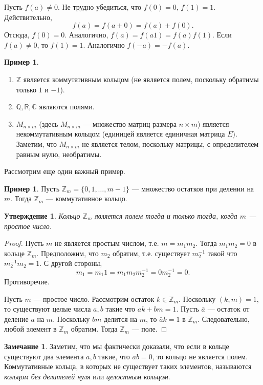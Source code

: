 \documentclass[12pt, titlepage, oneside]{amsbook}
\newcommand{\ZZ}{\mathbb{Z}}
\newcommand{\RR}{\mathbb{R}}
\newcommand{\CC}{\mathbb{C}}
\newcommand{\QQ}{\mathbb{Q}}
\newtheorem{claim}[theorem]{Утверждение}
\theoremstyle{definition}
\newtheorem{example}[theorem]{Пример}
\newtheorem{remark}[theorem]{Замечание}
\theoremstyle{remark}
\begin{document}
Пусть $f(a)\neq 0$. Не трудно убедиться, что $f(0)=0$, $f(1)=1$. Действительно, $$f(a)=f(a+0)=f(a)+f(0).$$ Отсюда, $f(0)=0$. Аналогично, $f(a)=f(a1)=f(a)f(1)$. Если $f(a)\neq 0$, то $f(1)=1$. Аналогично $f(-a)=-f(a)$.

\begin{example}
	\begin{enumerate}
		\item $\ZZ$ является коммутативным кольцом (не является полем, поскольку обратимы только $1$ и $-1$).
		\item $\QQ, \RR, \CC$ являются полями.
		\item $M_{n\times m}$ (здесь $M_{n\times m}$ --- множество матриц размера $n\times m$) является некоммутативным кольцом (единицей является единичная матрица $E$). Заметим, что $M_{n\times m}$ не является телом, поскольку матрицы, с определителем равным нулю, необратимы.
	\end{enumerate}
\end{example}

Рассмотрим еще один важный пример.

\begin{example}
	Пусть $\ZZ_m=\{0,1,\ldots,m-1\}$ --- множество остатков при делении на $m$. Тогда $\ZZ_m$ --- коммутативное кольцо.
\end{example}

\begin{claim}
	\label{Kol1} Кольцо $\ZZ_m$ является полем тогда и только тогда, когда $m$ --- простое число.
\end{claim}

\begin{proof}
	Пусть $m$ не является простым числом, т.е. $m=m_1 m_2$. Тогда $m_1m_2=0$ в кольце $\ZZ_m$. Предположим, что $m_2$ обратим, т.е. существует $m^{-1}_2$ такой что $m^{-1}_2m_2=1$. С другой стороны, $$m_1=m_1 1=m_1 m_2 m^{-1}_2=0 m^{-1}_2=0.$$ Противоречие.
	
	Пусть $m$ --- простое число. Рассмотрим остаток $k\in\ZZ_m$. Поскольку $(k,m)=1$, то существуют целые числа $a,b$ такие что $ak+bm=1$. Пусть $\bar{a}$ --- остаток от деление $a$ на $m$. Поскольку $bm$ делится на $m$, то $\bar{a} k=1$ в $\ZZ_m$. Следовательно, любой элемент в $\ZZ_m$ обратим. Тогда $\ZZ_m$ --- поле.
\end{proof}

\begin{remark}
	Заметим, что мы фактически доказали, что если в кольце существуют два элемента $a,b$ такие, что $ab=0$, то кольцо не является полем. Коммутативные кольца, в которых не существует таких элементов, называются \emph{кольцом без делителей нуля} или \emph{целостным кольцом}.
\end{remark}
\end{document}
